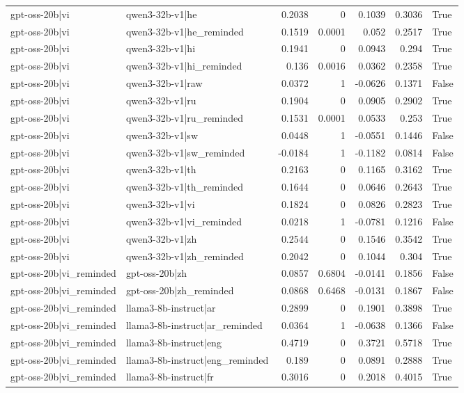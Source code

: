 \begin{table}
\begin{tabular}{l l r r r r l}
gpt-oss-20b|vi & qwen3-32b-v1|he & 0.2038 & 0 & 0.1039 & 0.3036 & True \\
gpt-oss-20b|vi & qwen3-32b-v1|he_reminded & 0.1519 & 0.0001 & 0.052 & 0.2517 & True \\
gpt-oss-20b|vi & qwen3-32b-v1|hi & 0.1941 & 0 & 0.0943 & 0.294 & True \\
gpt-oss-20b|vi & qwen3-32b-v1|hi_reminded & 0.136 & 0.0016 & 0.0362 & 0.2358 & True \\
gpt-oss-20b|vi & qwen3-32b-v1|raw & 0.0372 & 1 & -0.0626 & 0.1371 & False \\
gpt-oss-20b|vi & qwen3-32b-v1|ru & 0.1904 & 0 & 0.0905 & 0.2902 & True \\
gpt-oss-20b|vi & qwen3-32b-v1|ru_reminded & 0.1531 & 0.0001 & 0.0533 & 0.253 & True \\
gpt-oss-20b|vi & qwen3-32b-v1|sw & 0.0448 & 1 & -0.0551 & 0.1446 & False \\
gpt-oss-20b|vi & qwen3-32b-v1|sw_reminded & -0.0184 & 1 & -0.1182 & 0.0814 & False \\
gpt-oss-20b|vi & qwen3-32b-v1|th & 0.2163 & 0 & 0.1165 & 0.3162 & True \\
gpt-oss-20b|vi & qwen3-32b-v1|th_reminded & 0.1644 & 0 & 0.0646 & 0.2643 & True \\
gpt-oss-20b|vi & qwen3-32b-v1|vi & 0.1824 & 0 & 0.0826 & 0.2823 & True \\
gpt-oss-20b|vi & qwen3-32b-v1|vi_reminded & 0.0218 & 1 & -0.0781 & 0.1216 & False \\
gpt-oss-20b|vi & qwen3-32b-v1|zh & 0.2544 & 0 & 0.1546 & 0.3542 & True \\
gpt-oss-20b|vi & qwen3-32b-v1|zh_reminded & 0.2042 & 0 & 0.1044 & 0.304 & True \\
gpt-oss-20b|vi_reminded & gpt-oss-20b|zh & 0.0857 & 0.6804 & -0.0141 & 0.1856 & False \\
gpt-oss-20b|vi_reminded & gpt-oss-20b|zh_reminded & 0.0868 & 0.6468 & -0.0131 & 0.1867 & False \\
gpt-oss-20b|vi_reminded & llama3-8b-instruct|ar & 0.2899 & 0 & 0.1901 & 0.3898 & True \\
gpt-oss-20b|vi_reminded & llama3-8b-instruct|ar_reminded & 0.0364 & 1 & -0.0638 & 0.1366 & False \\
gpt-oss-20b|vi_reminded & llama3-8b-instruct|eng & 0.4719 & 0 & 0.3721 & 0.5718 & True \\
gpt-oss-20b|vi_reminded & llama3-8b-instruct|eng_reminded & 0.189 & 0 & 0.0891 & 0.2888 & True \\
gpt-oss-20b|vi_reminded & llama3-8b-instruct|fr & 0.3016 & 0 & 0.2018 & 0.4015 & True \\

\end{tabular}
\end{table}
